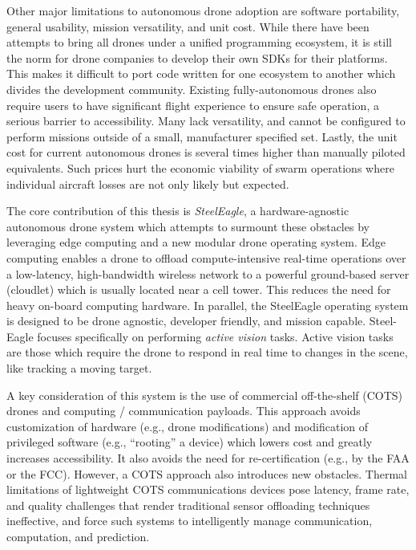 Other major limitations to autonomous drone adoption are software portability, general usability, mission versatility, and unit cost. While there have been attempts to bring all drones under a unified programming ecosystem, it is still the norm for drone companies to develop their own SDKs for their platforms. This makes it difficult to port code written for one ecosystem to another which divides the development community. Existing fully-autonomous drones also require users to have significant flight experience to ensure safe operation, a serious barrier to accessibility. Many lack versatility, and cannot be configured to perform missions outside of a small, manufacturer specified set. Lastly, the unit cost for current autonomous drones is several times higher than manually piloted equivalents. Such prices hurt the economic viability of swarm operations where individual aircraft losses are not only likely but expected.

The core contribution of this thesis is \textit{SteelEagle}, a hardware-agnostic autonomous drone system which attempts to surmount these obstacles by leveraging edge computing and a new modular drone operating system. Edge computing enables a drone to offload compute-intensive real-time operations over a low-latency, high-bandwidth wireless network to a powerful ground-based server (cloudlet) which is usually located near a cell tower. This reduces the need for heavy on-board computing hardware. In parallel, the SteelEagle operating system is designed to be drone agnostic, developer friendly, and mission capable. Steel-Eagle focuses specifically on performing \textit{active vision} tasks. Active vision tasks are those which require the drone to respond in real time to changes in the scene, like tracking a moving target.

A key consideration of this system is the use of commercial off-the-shelf (COTS) drones and computing / communication payloads. This approach avoids customization of hardware (e.g., drone modifications) and modification of privileged software (e.g., “rooting” a device) which lowers cost and greatly increases accessibility. It also avoids the need for re-certification (e.g., by the FAA or the FCC). However, a COTS approach also introduces new obstacles. Thermal limitations of lightweight COTS communications devices pose latency, frame rate, and quality challenges that render traditional sensor offloading techniques ineffective, and force such systems to intelligently manage communication, computation, and prediction.

